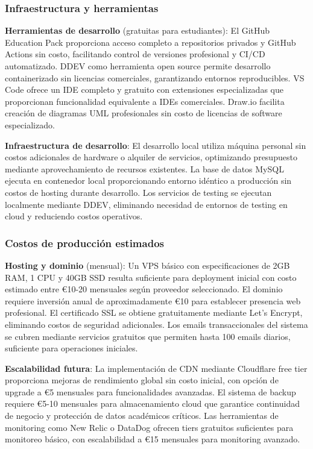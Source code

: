 \documentclass[12pt,a4paper,oneside]{report}
\begin{document}
\subsubsection{Infraestructura y
herramientas}\label{infraestructura-y-herramientas}

\textbf{Herramientas de desarrollo} (gratuitas para estudiantes): El GitHub Education Pack proporciona acceso completo a repositorios privados y GitHub Actions sin costo, facilitando control de versiones profesional y CI/CD automatizado. DDEV como herramienta open source permite desarrollo containerizado sin licencias comerciales, garantizando entornos reproducibles. VS Code ofrece un IDE completo y gratuito con extensiones especializadas que proporcionan funcionalidad equivalente a IDEs comerciales. Draw.io facilita creación de diagramas UML profesionales sin costo de licencias de software especializado.

\textbf{Infraestructura de desarrollo}: El desarrollo local utiliza máquina personal sin costos adicionales de hardware o alquiler de servicios, optimizando presupuesto mediante aprovechamiento de recursos existentes. La base de datos MySQL ejecuta en contenedor local proporcionando entorno idéntico a producción sin costos de hosting durante desarrollo. Los servicios de testing se ejecutan localmente mediante DDEV, eliminando necesidad de entornos de testing en cloud y reduciendo costos operativos.

\subsubsection{Costos de producción
estimados}\label{costos-de-producciuxf3n-estimados}

\textbf{Hosting y dominio} (mensual): Un VPS básico con especificaciones de 2GB RAM, 1 CPU y 40GB SSD resulta suficiente para deployment inicial con costo estimado entre €10-20 mensuales según proveedor seleccionado. El dominio requiere inversión anual de aproximadamente €10 para establecer presencia web profesional. El certificado SSL se obtiene gratuitamente mediante Let's Encrypt, eliminando costos de seguridad adicionales. Los emails transaccionales del sistema se cubren mediante servicios gratuitos que permiten hasta 100 emails diarios, suficiente para operaciones iniciales.

\textbf{Escalabilidad futura}: La implementación de CDN mediante Cloudflare free tier proporciona mejoras de rendimiento global sin costo inicial, con opción de upgrade a €5 mensuales para funcionalidades avanzadas. El sistema de backup requiere €5-10 mensuales para almacenamiento cloud que garantice continuidad de negocio y protección de datos académicos críticos. Las herramientas de monitoring como New Relic o DataDog ofrecen tiers gratuitos suficientes para monitoreo básico, con escalabilidad a €15 mensuales para monitoring avanzado.
\end{document}
